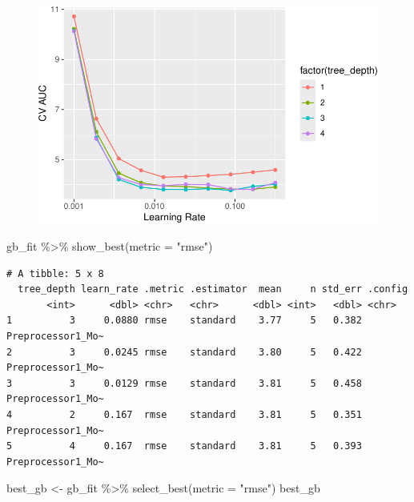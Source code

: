 \documentclass[
]{article}
\newenvironment{Shaded}{\begin{snugshade}}{\end{snugshade}}
\newcommand{\AttributeTok}[1]{\textcolor[rgb]{0.40,0.45,0.13}{#1}}
\newcommand{\FunctionTok}[1]{\textcolor[rgb]{0.28,0.35,0.67}{#1}}
\newcommand{\NormalTok}[1]{\textcolor[rgb]{0.00,0.23,0.31}{#1}}
\newcommand{\OtherTok}[1]{\textcolor[rgb]{0.00,0.23,0.31}{#1}}
\newcommand{\SpecialCharTok}[1]{\textcolor[rgb]{0.37,0.37,0.37}{#1}}
\newcommand{\StringTok}[1]{\textcolor[rgb]{0.13,0.47,0.30}{#1}}
\begin{document}
\begin{figure}[H]

{\centering \includegraphics{hw4_files/figure-pdf/boostCV-1.pdf}

}

\end{figure}

\begin{Shaded}
\begin{Highlighting}[]
\NormalTok{gb\_fit }\SpecialCharTok{\%\textgreater{}\%}
  \FunctionTok{show\_best}\NormalTok{(}\AttributeTok{metric =} \StringTok{"rmse"}\NormalTok{)}
\end{Highlighting}
\end{Shaded}

\begin{verbatim}
# A tibble: 5 x 8
  tree_depth learn_rate .metric .estimator  mean     n std_err .config          
       <int>      <dbl> <chr>   <chr>      <dbl> <int>   <dbl> <chr>            
1          3     0.0880 rmse    standard    3.77     5   0.382 Preprocessor1_Mo~
2          3     0.0245 rmse    standard    3.80     5   0.422 Preprocessor1_Mo~
3          3     0.0129 rmse    standard    3.81     5   0.458 Preprocessor1_Mo~
4          2     0.167  rmse    standard    3.81     5   0.351 Preprocessor1_Mo~
5          4     0.167  rmse    standard    3.81     5   0.393 Preprocessor1_Mo~
\end{verbatim}

\begin{Shaded}
\begin{Highlighting}[]
\NormalTok{best\_gb }\OtherTok{\textless{}{-}}\NormalTok{ gb\_fit }\SpecialCharTok{\%\textgreater{}\%}
  \FunctionTok{select\_best}\NormalTok{(}\AttributeTok{metric =} \StringTok{"rmse"}\NormalTok{)}
\NormalTok{best\_gb}
\end{Highlighting}
\end{Shaded}
\end{document}
